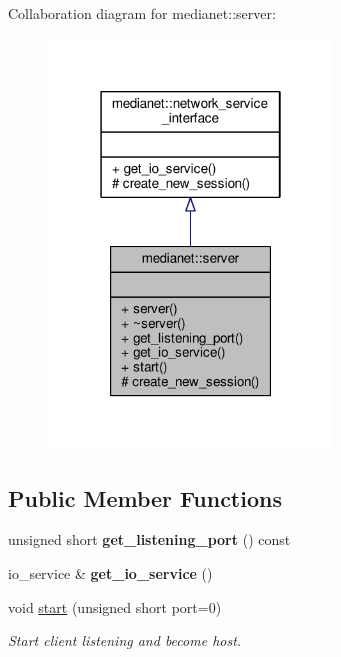 Collaboration diagram for medianet\+::server\+:
\nopagebreak
\begin{figure}[H]
\begin{center}
\leavevmode
\includegraphics[width=214pt]{classmedianet_1_1server__coll__graph}
\end{center}
\end{figure}
\subsection*{Public Member Functions}
\begin{DoxyCompactItemize}
\item 
\mbox{\label{classmedianet_1_1server_aa491ff44a5440d6466af3f906c871ab2}} 
unsigned short {\bfseries get\+\_\+listening\+\_\+port} () const
\item 
\mbox{\label{classmedianet_1_1server_a95e7f650666681da38a8e941bdd0bd24}} 
io\+\_\+service \& {\bfseries get\+\_\+io\+\_\+service} ()
\item 
void \mbox{\hyperlink{classmedianet_1_1server_a4765c462ea91a316816ef5db8592705d}{start}} (unsigned short port=0)
\begin{DoxyCompactList}\small\item\em Start client listening and become host. \end{DoxyCompactList}\end{DoxyCompactItemize}

